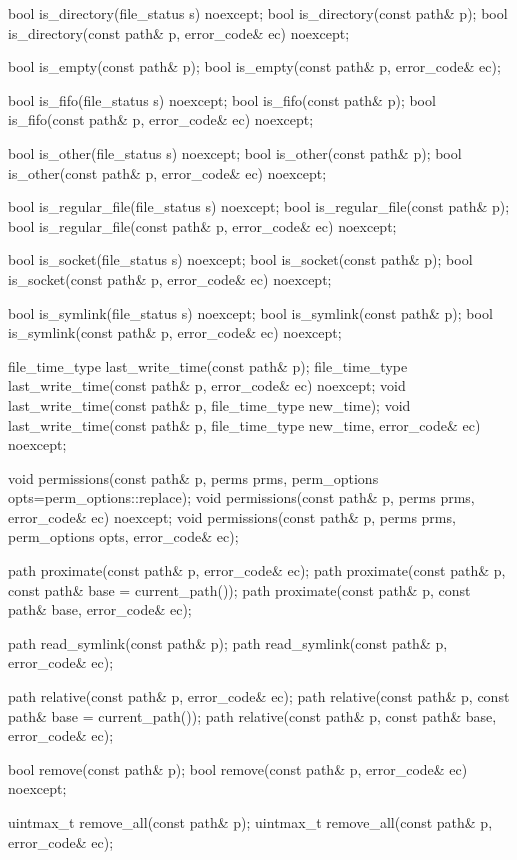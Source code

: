 \begin{codeblock}
{  bool is_directory(file_status s) noexcept;
  bool is_directory(const path& p);
  bool is_directory(const path& p, error_code& ec) noexcept;

  bool is_empty(const path& p);
  bool is_empty(const path& p, error_code& ec);

  bool is_fifo(file_status s) noexcept;
  bool is_fifo(const path& p);
  bool is_fifo(const path& p, error_code& ec) noexcept;

  bool is_other(file_status s) noexcept;
  bool is_other(const path& p);
  bool is_other(const path& p, error_code& ec) noexcept;

  bool is_regular_file(file_status s) noexcept;
  bool is_regular_file(const path& p);
  bool is_regular_file(const path& p, error_code& ec) noexcept;

  bool is_socket(file_status s) noexcept;
  bool is_socket(const path& p);
  bool is_socket(const path& p, error_code& ec) noexcept;

  bool is_symlink(file_status s) noexcept;
  bool is_symlink(const path& p);
  bool is_symlink(const path& p, error_code& ec) noexcept;

  file_time_type last_write_time(const path& p);
  file_time_type last_write_time(const path& p, error_code& ec) noexcept;
  void last_write_time(const path& p, file_time_type new_time);
  void last_write_time(const path& p, file_time_type new_time,
                       error_code& ec) noexcept;

  void permissions(const path& p, perms prms, perm_options opts=perm_options::replace);
  void permissions(const path& p, perms prms, error_code& ec) noexcept;
  void permissions(const path& p, perms prms, perm_options opts, error_code& ec);

  path proximate(const path& p, error_code& ec);
  path proximate(const path& p, const path& base = current_path());
  path proximate(const path& p, const path& base, error_code& ec);

  path read_symlink(const path& p);
  path read_symlink(const path& p, error_code& ec);

  path relative(const path& p, error_code& ec);
  path relative(const path& p, const path& base = current_path());
  path relative(const path& p, const path& base, error_code& ec);

  bool remove(const path& p);
  bool remove(const path& p, error_code& ec) noexcept;

  uintmax_t remove_all(const path& p);
  uintmax_t remove_all(const path& p, error_code& ec);

}
\end{codeblock}
